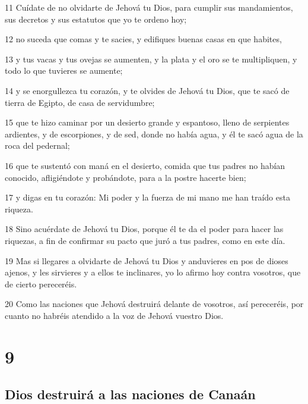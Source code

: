 \par 11 Cuídate de no olvidarte de Jehová tu Dios, para cumplir sus mandamientos, sus decretos y sus estatutos que yo te ordeno hoy;
\par 12 no suceda que comas y te sacies, y edifiques buenas casas en que habites,
\par 13 y tus vacas y tus ovejas se aumenten, y la plata y el oro se te multipliquen, y todo lo que tuvieres se aumente;
\par 14 y se enorgullezca tu corazón, y te olvides de Jehová tu Dios, que te sacó de tierra de Egipto, de casa de servidumbre;
\par 15 que te hizo caminar por un desierto grande y espantoso, lleno de serpientes ardientes, y de escorpiones, y de sed, donde no había agua, y él te sacó agua de la roca del pedernal;
\par 16 que te sustentó con maná en el desierto, comida que tus padres no habían conocido, afligiéndote y probándote, para a la postre hacerte bien;
\par 17 y digas en tu corazón: Mi poder y la fuerza de mi mano me han traído esta riqueza.
\par 18 Sino acuérdate de Jehová tu Dios, porque él te da el poder para hacer las riquezas, a fin de confirmar su pacto que juró a tus padres, como en este día.
\par 19 Mas si llegares a olvidarte de Jehová tu Dios y anduvieres en pos de dioses ajenos, y les sirvieres y a ellos te inclinares, yo lo afirmo hoy contra vosotros, que de cierto pereceréis.
\par 20 Como las naciones que Jehová destruirá delante de vosotros, así pereceréis, por cuanto no habréis atendido a la voz de Jehová vuestro Dios.

\chapter{9}

\section{Dios destruirá a las naciones de Canaán}


